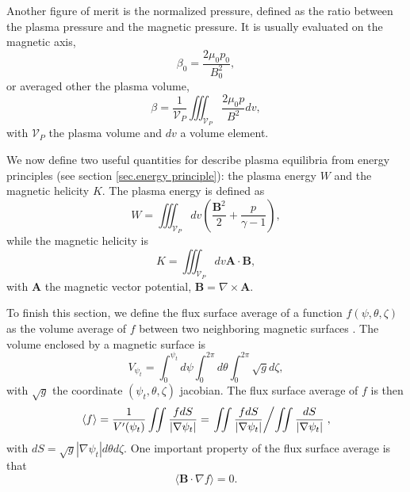 \documentclass[my_thesis.tex]{subfiles}
\begin{document}
Another figure of merit is the normalized pressure, defined as the ratio between the plasma pressure and the magnetic pressure. It is usually evaluated on the magnetic axis,
\begin{equation}
	\beta_0 = \frac{2\mu_0 p_0}{B_0^2},
\end{equation}
or averaged other the plasma volume,
\begin{equation}
	\beta = \frac{1}{\mathcal{V}_P} \iiint_{\mathcal{V}_P} \frac{2\mu_0 p}{B^2} dv,
\end{equation}
with $\mathcal{V}_P$ the plasma volume and $dv$ a volume element.

We now define two useful quantities for describe plasma equilibria from energy principles (see section \ref{sec.energy principle}): the plasma energy $W$ and the magnetic helicity $K$. The plasma energy is defined as 
\begin{equation}
	W = \iiint_{\mathcal{V}_P} dv \left(\frac{\mathbf{B}^2}{2} + \frac{p}{\gamma-1}\right), \label{eq. energy functional}
\end{equation}
while the magnetic helicity is
\begin{equation}
	K = \iiint_{\mathcal{V}_P} dv \mathbf{A} \cdot \mathbf{B},
\end{equation}
with $\mathbf{A}$ the magnetic vector potential, $\mathbf{B}=\nabla\times\mathbf{A}$.

To finish this section, we define the flux surface average of a function $f(\psi,\theta,\zeta)$ as the volume average of $f$ between two neighboring magnetic surfaces \citep{helanderTheoryPlasmaConfinement2014}. The volume enclosed by a magnetic surface is
\begin{equation}
	V_{\psi_t} = \int_0^{\psi_t} d\psi \int_0^{2\pi} d\theta \int_0^{2\pi} \sqrt{g}d\zeta,
\end{equation}
with $\sqrt{g}$ the coordinate $(\psi_t, \theta, \zeta)$ jacobian. The flux surface average of $f$ is then
\begin{equation}
	\langle f \rangle = \frac{1}{V'(\psi_t)}\iint \frac{f dS}{|\nabla \psi_t|} = \left.\iint \frac{f dS}{|\nabla \psi_t|} \middle/ \iint\frac{dS}{|\nabla \psi_t|} \right.,
\end{equation}
with $dS=\sqrt{g}|\nabla\psi_t|d\theta d\zeta$. One important property of the flux surface average is that
\begin{equation}
	\langle \mathbf{B}\cdot\nabla f\rangle = 0. \label{eq.property_flux_average}
\end{equation}
\end{document}

